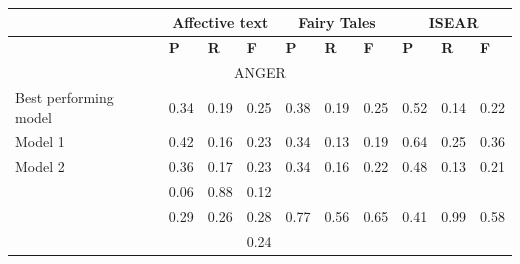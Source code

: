 \documentclass[11pt]{article}
\begin{document}
\begin{table}[!htbp]
\centering

\begin{tabular}{|l|l|l|l|l|l|l|l|l|l|}
\hline
    & 
    \multicolumn{3}{|c|}{{Affective text}} & 
    \multicolumn{3}{|c|}{{Fairy Tales}} & 
    \multicolumn{3}{|c|}{{ISEAR}}  \\
        
\hline
    & 
    \textbf{P} & 
    \textbf{R} & 
    \textbf{F} & 
    \textbf{P} & 
    \textbf{R} & 
    \textbf{F} & 
    \textbf{P} & 
    \textbf{R} & 
    \textbf{F} \\ 
     
\hline                      
    \multicolumn{10}{|c|}{{ ANGER}} \\                 
                                         
\hline
    \tiny{Best performing model} & 
    \footnotesize{0.34} & 
    \footnotesize{0.19} & 
    \footnotesize{0.25} & 
    \footnotesize{0.38} & 
    \footnotesize{0.19} & 
    \footnotesize{0.25} & 
    \footnotesize{0.52} & 
    \footnotesize{0.14} & 
    \footnotesize{0.22} \\ 

\hline
    \tiny{Model 1} & 
    \footnotesize{0.42} & 
    \footnotesize{0.16} & 
    \footnotesize{0.23} & 
    \footnotesize{0.34} & 
    \footnotesize{0.13} & 
    \footnotesize{0.19} & 
    \footnotesize{0.64} & 
    \footnotesize{0.25} & 
    \footnotesize{0.36} \\ 

\hline
    \tiny{Model 2} & 
    \footnotesize{0.36} & 
    \footnotesize{0.17} & 
    \footnotesize{0.23} & 
    \footnotesize{0.34} & 
    \footnotesize{0.16} & 
    \footnotesize{0.22} & 
    \footnotesize{0.48} & 
    \footnotesize{0.13} & 
    \footnotesize{0.21} \\ 


\hline
    \tiny{\cite{strapparava2008learning} } &
    \footnotesize{0.06} & 
    \footnotesize{0.88} & 
    \footnotesize{0.12} &
    &
    &
    &
    &
    &
    \\

\hline
    \tiny{\cite{kim2010evaluation} } &
    \footnotesize{0.29} & 
    \footnotesize{0.26} & 
    \footnotesize{0.28} &
    \footnotesize{0.77} & 
    \footnotesize{0.56} & 
    \footnotesize{0.65} &
    \footnotesize{0.41} & 
    \footnotesize{0.99} & 
    \footnotesize{0.58} \\
    
\hline
    \tiny{\cite{danisman2008feeler} } &
    \footnotesize{} & 
    \footnotesize{} & 
    \footnotesize{0.24} &
    \footnotesize{} & 
    \footnotesize{} & 
    \footnotesize{} &
    \footnotesize{} & 
    \footnotesize{} & 
    \footnotesize{} \\



\end{tabular}
\end{table}
\end{document}
